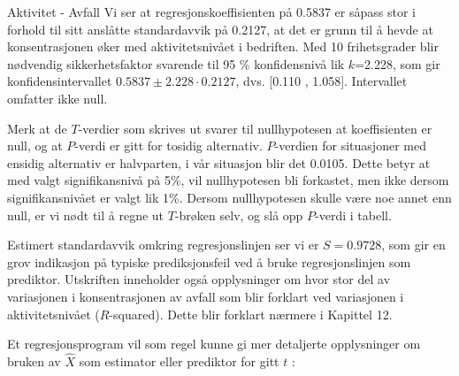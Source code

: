 \begin{eksempel}{Aktivitet - Avfall}
Vi ser at regresjonskoeffisienten på 0.5837 er såpass stor i forhold
til sitt anslåtte standardavvik på 0.2127, at det er grunn til
å hevde at konsentrasjonen øker med aktivitetsnivået i bedriften.
Med 10 frihetsgrader blir nødvendig sikkerhetsfaktor svarende til
95 \% konfidensnivå lik $k$=2.228, som gir konfidensintervallet
 $0.5837 \pm 2.228 \cdot 0.2127$, dvs. [0.110 , 1.058]. Intervallet omfatter ikke null.

Merk at de $T$-verdier som skrives ut svarer til nullhypotesen at
koef\-fisienten er null, og at $P$-verdi er gitt for tosidig alternativ.
 $P$-verdien for situasjoner med  ensidig alternativ er halvparten, i vår
situasjon blir det 0.0105. Dette betyr at med valgt signifikansnivå på
5\%, vil nullhypotesen bli forkastet, men ikke dersom signifikansnivået er
valgt lik 1\%.
Dersom nullhypotesen skulle være noe annet enn null, er vi nødt
til å regne ut $T$-brøken selv, og slå opp $P$-verdi i tabell.

Estimert standardavvik omkring regresjonslinjen ser vi er $S=0.9728$, som gir en
grov indikasjon på typiske prediksjonsfeil ved å bruke 
regresjons\-linjen som
prediktor. Utskriften inneholder også  opplysninger om hvor stor del av
variasjonen i konsentrasjonen av avfall som blir forklart ved
variasjonen i aktivitetsnivået ($R$-squared). Dette blir 
forklart nærmere i Kapittel 12.

Et regresjonsprogram vil som regel kunne gi mer detaljerte opplysninger
om bruken av $\hat X$ som estimator eller prediktor for gitt $t$ :\\

\begin{center}  \end{center}
 

\end{eksempel}
